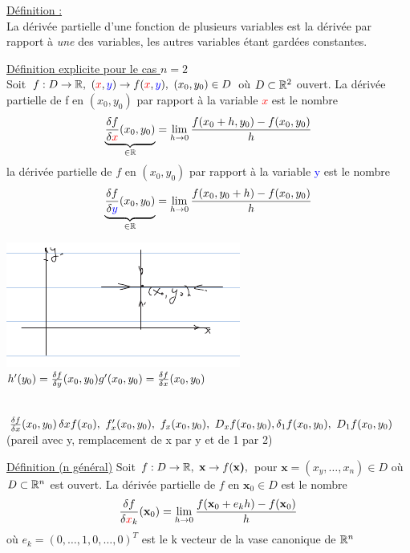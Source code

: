\documentclass[12pt,a4paper]{article}
\begin{document}
\begin{boite}
	\underline{Définition :}\\
	La dérivée partielle d'une fonction de plusieurs variables est la dérivée par rapport à \textit{une} des variables, les autres variables étant gardées constantes.
\end{boite}
\begin{boite}[1]
	\underline{Définition explicite pour le cas $n=2$}\\
	Soit $f : D\to \R,\ (\textcolor{red}{x},\textcolor{blue}{y}) \to f(\textcolor{red}{x},\textcolor{blue}{y}),\ (x_0,y_0) \in D$ où $D\subset \mathbb{R}^2$ ouvert. La dérivée partielle de f en $(x_0,y_0)$ par rapport à la variable \textcolor{red}{$x$} est le nombre
\begin{equation*}
\underbrace{\frac{\delta f}{\delta \textcolor{red}{x}} (x_0,y_0)}_{\in \mathbb{R}} = \lim\limits_{h\to 0} \frac{f(x_0+h,y_0) - f(x_0,y_0)}{h}
\end{equation*}
la dérivée partielle de $f$ en $(x_0,y_0)$ par rapport à la variable \textcolor{blue}{y} est le nombre
\begin{equation*}
	\underbrace{\frac{\delta f}{\delta \textcolor{blue}{y}} (x_0,y_0)}_{\in \mathbb{R}} = \lim\limits_{h\to 0} \frac{f(x_0,y_0+h) - f(x_0,y_0)}{h}
\end{equation*}
\end{boite}
\includegraphics[scale=0.5]{images/deriv_part}\\
$h'(y_0) = \frac{\delta f}{\delta y}(x_0,y_0)\\
g'(x_0,y_0) = \frac{\delta f}{\delta x}(x_0,y_0)$
\begin{boite}[0.7]
\\
$\frac{\delta f}{\delta x} (x_0,y_0)\, \delta x f(x_0),\ f_x'(x_0,y_0),\ f_x(x_0,y_0),\ D_xf(x_0,y_0),\\ \delta_1 f(x_0,y_0),\ D_1 f(x_0,y_0)$\\
(pareil avec y, remplacement de x par y et de 1 par 2)
\end{boite}
\begin{boite}
	\underline{Définition (n général)} Soit $f:D\to \mathbb{R},\ \textbf{x} \to f(\textbf{x)},$ pour $\textbf{x} = (x_y,\ldots,x_n) \in D$ où $D\subset \mathbb{R}^n$ est ouvert. La dérivée partielle de $f$ en $\textbf{x}_0\in D$ est le nombre 
	\begin{equation*}
	\frac{\delta f}{\delta \textcolor{red}{x}_k} (\textbf{x}_0) = \lim\limits_{h\to 0} \frac{f(\textbf{x}_0 + e_k h)-f(\textbf{x}_0)}{h}
	\end{equation*}
	où $e_k = (0,\ldots,1,0,\ldots,0)^T$ est le k vecteur de la vase canonique de $\mathbb{R}^n$
\end{boite}
\end{document}
